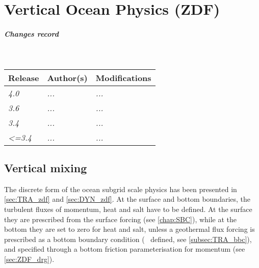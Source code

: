 \documentclass[../main/NEMO_manual]{subfiles}
\begin{document}
\chapter{Vertical Ocean Physics (ZDF)}
\label{chap:ZDF}

\thispagestyle{plain}

\chaptertoc

\paragraph{Changes record} ~\\

{\footnotesize
  \begin{tabularx}{\textwidth}{l||X|X}
    Release & Author(s) & Modifications \\
    \hline
    {\em   4.0} & {\em ...} & {\em ...} \\
    {\em   3.6} & {\em ...} & {\em ...} \\
    {\em   3.4} & {\em ...} & {\em ...} \\
    {\em <=3.4} & {\em ...} & {\em ...}
  \end{tabularx}
}

\clearpage


\section{Vertical mixing}
\label{sec:ZDF}

The discrete form of the ocean subgrid scale physics has been presented in
\autoref{sec:TRA_zdf} and \autoref{sec:DYN_zdf}.
At the surface and bottom boundaries, the turbulent fluxes of momentum, heat and salt have to be defined.
At the surface they are prescribed from the surface forcing (see \autoref{chap:SBC}),
while at the bottom they are set to zero for heat and salt,
unless a geothermal flux forcing is prescribed as a bottom boundary condition (\ie\  defined,
see \autoref{subsec:TRA_bbc}), and specified through a bottom friction parameterisation for momentum
(see \autoref{sec:ZDF_drg}).
\end{document}
